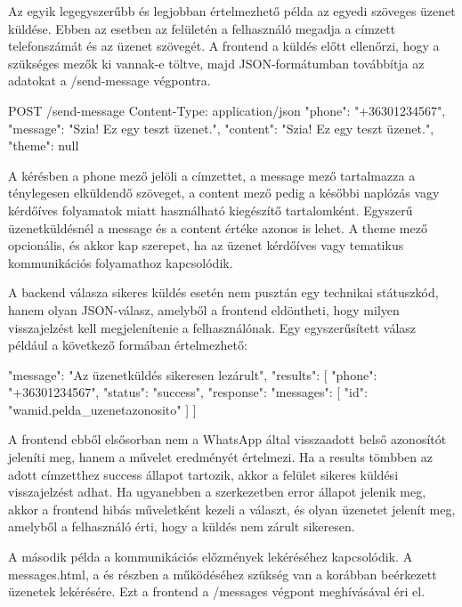 Az egyik legegyszerűbb és legjobban értelmezhető példa az egyedi szöveges üzenet küldése. Ebben az esetben az  felületén a felhasználó megadja a címzett telefonszámát és az üzenet szövegét. A frontend a küldés előtt ellenőrzi, hogy a szükséges mezők ki vannak-e töltve, majd JSON-formátumban továbbítja az adatokat a /send-message végpontra.

\begin{CodeBlock}
POST /send-message
Content-Type: application/json
{
  "phone": "+36301234567",
  "message": "Szia! Ez egy teszt üzenet.",
  "content": "Szia! Ez egy teszt üzenet.",
  "theme": null
}
\end{CodeBlock}

A kérésben a phone mező jelöli a címzettet, a message mező tartalmazza a ténylegesen elküldendő szöveget, a content mező pedig a későbbi naplózás vagy kérdőíves folyamatok miatt használható kiegészítő tartalomként. Egyszerű üzenetküldésnél a message és a content értéke azonos is lehet. A theme mező opcionális, és akkor kap szerepet, ha az üzenet kérdőíves vagy tematikus kommunikációs folyamathoz kapcsolódik.

A backend válasza sikeres küldés esetén nem pusztán egy technikai státuszkód, hanem olyan JSON-válasz, amelyből a frontend eldöntheti, hogy milyen visszajelzést kell megjelenítenie a felhasználónak. Egy egyszerűsített válasz például a következő formában értelmezhető:

\begin{CodeBlock}
{
  "message": "Az üzenetküldés sikeresen lezárult",
  "results": [
    {
      "phone": "+36301234567",
      "status": "success",
      "response": {
        "messages": [
          {
            "id": "wamid.pelda_uzenetazonosito"
          }
        ]
      }
    }
  ]
}
\end{CodeBlock}

A frontend ebből elsősorban nem a WhatsApp által visszaadott belső azonosítót jeleníti meg, hanem a művelet eredményét értelmezi. Ha a results tömbben az adott címzetthez success állapot tartozik, akkor a felület sikeres küldési visszajelzést adhat. Ha ugyanebben a szerkezetben error állapot jelenik meg, akkor a frontend hibás műveletként kezeli a választ, és olyan üzenetet jelenít meg, amelyből a felhasználó érti, hogy a küldés nem zárult sikeresen.

A második példa a kommunikációs előzmények lekéréséhez kapcsolódik. A messages.html, a  és részben a  működéséhez szükség van a korábban beérkezett üzenetek lekérésére. Ezt a frontend a /messages végpont meghívásával éri el.

